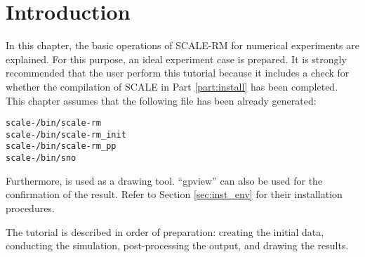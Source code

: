 \section{Introduction} \label{sec:ideal_exp_intro}

In this chapter, the basic operations of SCALE-RM for numerical experiments are explained. For this purpose, an ideal experiment case is prepared. It is strongly recommended that the user perform this tutorial because it includes a check for whether the compilation of SCALE  in Part \ref{part:install} has been completed. This chapter assumes that the following file has been already generated:
\begin{alltt}
  scale-{\version}/bin/scale-rm
  scale-{\version}/bin/scale-rm_init
  scale-{\version}/bin/scale-rm_pp
  scale-{\version}/bin/sno
\end{alltt}
Furthermore, \grads is used as a drawing tool. ``gpview'' can also be used for the confirmation of the result. Refer to Section \ref{sec:inst_env} for their installation procedures.

The tutorial is described in order of preparation: creating the initial data, conducting the simulation, post-processing the output, and drawing the results.


